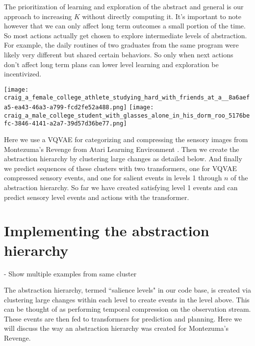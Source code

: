\documentclass{article}
\begin{document}
\hspace{0pt}


The prioritization of learning and exploration of the abstract and general is our approach to increasing $K$ without directly computing it. It's important to note however that we can only affect long term outcomes a small portion of the time. So most actions actually get chosen to explore intermediate levels of abstraction. For example, the daily routines of two graduates from the same program were likely very different but shared certain behaviors. So only when next actions don't affect long term plans can lower level learning and exploration be incentivized.

\texttt{[image: craig\_a\_female\_college\_athlete\_studying\_hard\_with\_friends\_at\_a\_\_8a6aefa5-ea43-46a3-a799-fcd2fe52a488.png]}
\texttt{[image: craig\_a\_male\_college\_student\_with\_glasses\_alone\_in\_his\_dorm\_roo\_5176befc-3846-4141-a2a7-39d57d36be77.png]}

Here we use a VQVAE \cite{oord2018neural}\cite{karpathy2021deepvectorquantization} for categorizing and compressing the sensory images from Montezuma's Revenge from Atari Learning Environment \cite{bellemare2013arcade}. Then we create the abstraction hierarchy by clustering large changes as detailed below. And finally we predict sequences of these clusters with two transformers\cite{vaswani2017attention}\cite{karpathy2020mingpt}, one for VQVAE compressed sensory events, and one for salient events in levels 1 through $n$ of the abstraction hierarchy. So far we have created satisfying level 1 events and can predict sensory level events and actions with the transformer.


\section{Implementing the abstraction hierarchy}
\label{sec:abstraction-hierarchy}

- Show multiple examples from same cluster

The abstraction hierarchy, termed \textquotedblleft salience levels" in our code base, is created via clustering large changes within each level to create events in the level above. This can be thought of as performing temporal compression on the observation stream. These events are then fed to transformers for prediction and planning. Here we will discuss the way an abstraction hierarchy was created for Montezuma's Revenge.
\end{document}
